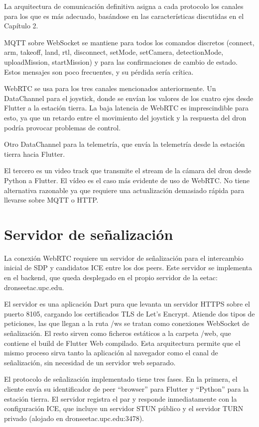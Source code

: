La arquitectura de comunicación definitiva asigna a cada protocolo los canales para los que es más adecuado, basándose en las características discutidas en el Capítulo 2.

MQTT sobre WebSocket se mantiene para todos los comandos discretos (connect, arm, takeoff, land, rtl, disconnect, setMode, setCamera, detectionMode, uploadMission, startMission) y para las confirmaciones de cambio de estado. Estos mensajes son poco frecuentes, y su pérdida sería crítica.

WebRTC se usa para los tres canales mencionados anteriormente. Un DataChannel para el joystick, donde se envían los valores de los cuatro ejes desde Flutter a la estación tierra. La baja latencia de WebRTC es imprescindible para esto, ya que un retardo entre el movimiento del joystick y la respuesta del dron podría provocar problemas de control.

Otro DataChannel para la telemetría, que envía la telemetría desde la estación tierra hacia Flutter. 

El tercero es un video track que transmite el stream de la cámara del dron desde Python a Flutter. El vídeo es el caso más evidente de uso de WebRTC. No tiene alternativa razonable ya que requiere una actualización demasiado rápida para llevarse sobre MQTT o HTTP.

\section{Servidor de señalización}
La conexión WebRTC requiere un servidor de señalización para el intercambio inicial de SDP y candidatos ICE entre los dos peers. Este servidor se implementa en el backend, que queda desplegado en el propio servidor de la eetac: dronseetac.upc.edu.

El servidor es una aplicación Dart pura que levanta un servidor HTTPS sobre el puerto 8105, cargando los certificados TLS de Let’s Encrypt. Atiende dos tipos de peticiones, las que llegan a la ruta /ws se tratan como conexiones WebSocket de señalización. El resto sirven como ficheros estáticos a la carpeta /web, que contiene el build de Flutter Web compilado. Esta arquitectura permite que el mismo proceso sirva tanto la aplicación al navegador como el canal de señalización, sin necesidad de un servidor web separado.

El protocolo de señalización implementado tiene tres fases. En la primera, el cliente envía su identificador de peer “browser” para Flutter y “Python” para la estación tierra. El servidor registra el par y responde inmediatamente con la configuración ICE, que incluye un servidor STUN público y el servidor TURN privado (alojado en dronseetac.upc.edu:3478). 

